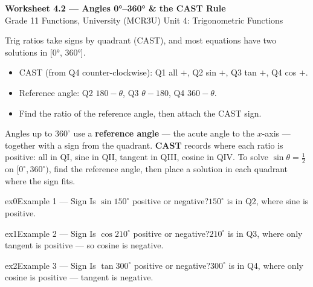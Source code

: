 \documentclass[11pt]{article}
\begin{document}
\begin{center}
{\LARGE\bfseries\color{titleblue}Worksheet 4.2 --- Angles 0°–360° \& the CAST Rule}\\[2pt]
{\small Grade 11 Functions, University (MCR3U) \textperiodcentered{} Unit 4: Trigonometric Functions}
\end{center}

\begin{ideabox}
Trig ratios take signs by quadrant (CAST), and most equations have two solutions in [0°, 360°].
\begin{itemize}[leftmargin=*,itemsep=2pt]
  \item CAST (from Q4 counter-clockwise): Q1 all $+$, Q2 sin $+$, Q3 tan $+$, Q4 cos $+$.
  \item Reference angle: Q2 $180-\theta$, Q3 $\theta-180$, Q4 $360-\theta$.
  \item Find the ratio of the reference angle, then attach the CAST sign.
\end{itemize}
\end{ideabox}

\begin{learnbox}
Angles up to $360^\circ$ use a \textbf{reference angle} — the acute angle to the $x$-axis — together with a sign from the quadrant.
\textbf{CAST} records where each ratio is positive: all in QI, sine in QII, tangent in QIII, cosine in QIV.
To solve $\sin\theta=\tfrac12$ on $[0^\circ,360^\circ)$, find the reference angle, then place a solution in each quadrant where the sign fits.
\end{learnbox}


\begin{example}{ex0}{Example 1 --- Sign}
Is $\sin150^\circ$ positive or negative?\soln $150^\circ$ is in Q2, where sine is positive.
\end{example}

\begin{example}{ex1}{Example 2 --- Sign}
Is $\cos210^\circ$ positive or negative?\soln $210^\circ$ is in Q3, where only tangent is positive — so cosine is negative.
\end{example}

\begin{example}{ex2}{Example 3 --- Sign}
Is $\tan300^\circ$ positive or negative?\soln $300^\circ$ is in Q4, where only cosine is positive — tangent is negative.
\end{example}
\end{document}

